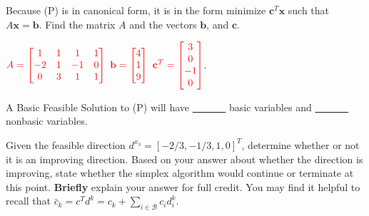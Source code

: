 \begin{parts}
 Because (P) is in canonical form, it is in the form minimize $\mathbf{c}^T \mathbf{x} $ such that $A\mathbf{x} = \mathbf{b}$.  Find the matrix $A$ and the vectors $\mathbf{b}$, and $\mathbf{c}$. 

$ \textcolor{red}{A = \left[ \begin{matrix} 1 & 1 & 1 & 1 \\ -2 & 1 & -1 & 0 \\ 0 & 3 & 1 & 1 \end{matrix} \right]}$\red{,} $\textcolor{red}{\mathbf{b}=\left[ \begin{matrix} 4 \\ 1 \\ 9 \end{matrix} \right]}$\red{,} $\textcolor{red}{\mathbf{c}^T=\left[ \begin{matrix} 3 \\ 0 \\ -1 \\ 0 \end{matrix} \right]}$.

\vfill

 A Basic Feasible Solution to (P) will have \underline{ \ \ \  \ \ \ } basic variables and \underline{ \ \ \  \ \ \ } nonbasic variables.


\vspace{1.5cm}


 Given the feasible direction $d^{x_3} = [-2/3, -1/3, 1, 0]^T$, determine whether or not it is an improving direction.  Based on your answer about whether the direction is improving, state whether the simplex algorithm would continue or terminate at this point.  {\bf Briefly} explain your answer for full credit.  You may find it helpful to recall that $\bar c_k = c^T d^k = c_k + \sum_{i \in \mathcal{B}} c_i d_i^k$.

\vspace{0.5cm}


\end{parts}
